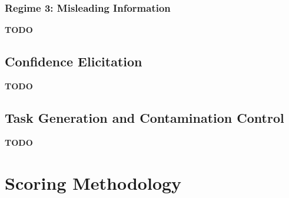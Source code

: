 \documentclass{article}
\begin{document}
\subsubsection{Regime 3: Misleading Information}
%
%

\textbf{TODO}

\subsection{Confidence Elicitation}
%
%
%

\textbf{TODO}

\subsection{Task Generation and Contamination Control}

\textbf{TODO}


\section{Scoring Methodology}
\label{sec:scoring}
\end{document}
